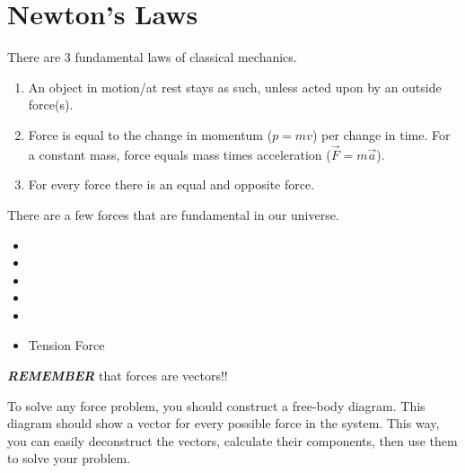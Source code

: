 \section{Newton's Laws}\label{sec:Newtons Laws}
There are 3 fundamental laws of classical mechanics.

\begin{enumerate}
  \item An object in motion/at rest stays as such, unless acted upon by an outside force(s).
  \item Force is equal to the change in momentum ($p=mv$) per change in time. For a constant mass, force equals mass times acceleration ($\vec{F} = m \vec{a}$).
  \item For every force there is an equal and opposite force.
\end{enumerate}
There are a few forces that are fundamental in our universe.

\begin{itemize}[noitemsep, nolistsep]
  \item {}
  \item {}
  \item {}
  \item {}
  \item {}
  \item Tension Force
\end{itemize}

\begin{remark*}
  \textbf{\emph{REMEMBER}} that forces are vectors!!
\end{remark*}

To solve any force problem, you should construct a free-body diagram.
This diagram should show a vector for every possible force in the system.
This way, you can easily deconstruct the vectors, calculate their components, then use them to solve your problem.

